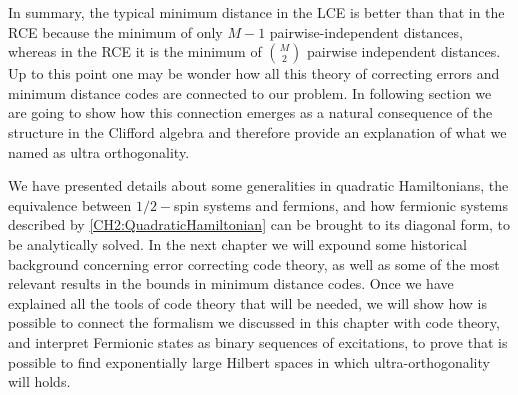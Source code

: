 \indent In summary, the typical minimum distance in the LCE is better than that in the RCE because the minimum of only $M-1$ pairwise-independent distances, whereas in the RCE it is the minimum of ${M\choose 2}$ pairwise independent distances.\\

\indent Up to this point one may be wonder how all this theory of correcting errors and minimum distance codes are connected to our problem. In following section we are going to show how this connection emerges as a natural consequence of the structure in the Clifford algebra and therefore provide an explanation of what we named as ultra orthogonality.







\indent We have presented details about some generalities in quadratic Hamiltonians, the equivalence between $1/2-$spin systems and fermions, and how fermionic systems described by \eqref{CH2:QuadraticHamiltonian} can be brought to its diagonal form, to be analytically solved. In the next chapter we will expound some historical background concerning  error correcting code theory, as well as some of the most relevant results in the bounds in minimum distance codes. Once we have explained all the tools of code theory that will be needed, we will show how is possible to connect the formalism we discussed in this chapter with code theory, and interpret Fermionic states as binary sequences of excitations, to prove that is possible to find exponentially large Hilbert spaces in which ultra-orthogonality will holds. 


